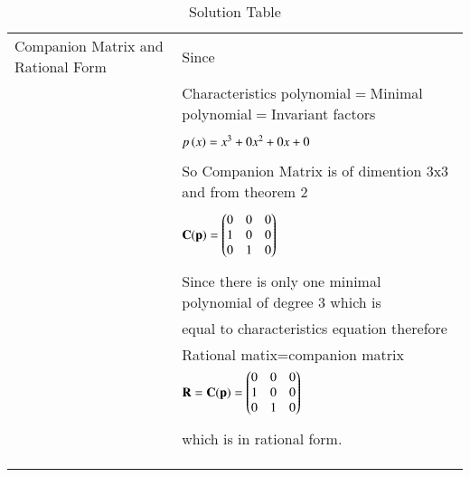 \documentclass[journal,12pt]{IEEEtran}
\begin{document}
\begin{longtable}{|l|l|}
\hline
\multirow{3}{*}{Companion Matrix and Rational Form} & \\
&Since\\
&\\
&Characteristics polynomial$=$Minimal polynomial$=$Invariant factors\\
&\\
&$p\left(x\right)=x^3+0x^2+0x+0$\\
&\\
&So Companion Matrix is of dimention 3x3 and from theorem 2\\
&\\
&$\mathbf{C(p)}=\begin{pmatrix}0&0&0\\1&0&0\\0&1&0\end{pmatrix}$\\
&\\
&Since there is only one minimal polynomial of degree 3 
which is\\ &equal to characteristics equation therefore\\ &Rational matix=companion matrix\\ 
&$\mathbf{R}=\mathbf{C(p)}=\begin{pmatrix}0&0&0\\1&0&0\\0&1&0\end{pmatrix}$\\
&\\
&which is in rational form.\\
&\\
\hline
&\\
\caption{Solution Table}
\label{table:2}
\end{longtable}
\end{document}
